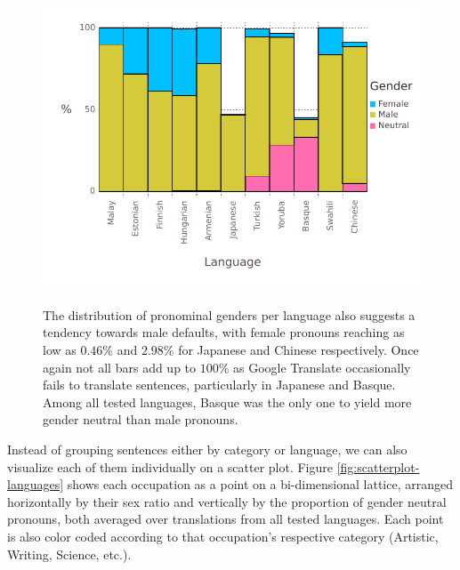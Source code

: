 \documentclass{article}
\begin{document}
\begin{figure}[H]
	\centering
	\includegraphics[width=\linewidth]{pictures/gender-by-language}
	\label{fig:gender-by-language}
	\caption{The distribution of pronominal genders per language also suggests a tendency towards male defaults, with female pronouns reaching as low as $0.46\%$ and $2.98\%$ for Japanese and Chinese respectively. Once again not all bars add up to $100\%$ as Google Translate occasionally fails to translate sentences, particularly in Japanese and Basque. Among all tested languages, Basque was the only one to yield more gender neutral than male pronouns.}
\end{figure}

Instead of grouping sentences either by category or language, we can also visualize each of them individually on a scatter plot. Figure \ref{fig:scatterplot-languages} shows each occupation as a point on a bi-dimensional lattice, arranged horizontally by their sex ratio and vertically by the proportion of gender neutral pronouns, both averaged over translations from all tested languages. Each point is also color coded according to that occupation's respective category (Artistic, Writing, Science, etc.).
\end{document}
